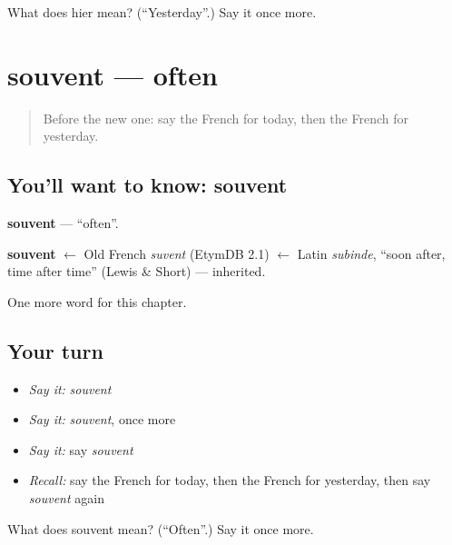 \begin{tcolorbox}[breakable,colback=teal!4,colframe=teal!35!black,title={Before you move on}]
What does hier mean? (\textquotedblleft{}Yesterday\textquotedblright{}.) Say it once more.
\end{tcolorbox}
\section[souvent]{souvent — often}

\label{lesson:FR-C98-souvent}



\begin{quote}
Before the new one: say the French for today, then the French for yesterday.
\end{quote}

\subsection*{You'll want to know: souvent}
\textbf{souvent} — \textquotedblleft{}often\textquotedblright{}.

\begin{cousinweb}
\textbf{souvent} $\leftarrow$ Old French \emph{suvent} (EtymDB 2.1) $\leftarrow$ Latin \emph{subinde}, \textquotedblleft{}soon after, time after time\textquotedblright{} (Lewis \& Short) — inherited.
\end{cousinweb}

\begin{grammarlens}[title={What you've built}]
One more word for this chapter.
\end{grammarlens}

\subsection*{Your turn}
\begin{itemize}
\raggedright
  \item \emph{Say it:} \emph{souvent}
  \item \emph{Say it:} \emph{souvent}, once more
  \item \emph{Say it:} say \emph{souvent}
  \item \emph{Recall:} say the French for today, then the French for yesterday, then say \emph{souvent} again
\end{itemize}

\begin{tcolorbox}[breakable,colback=teal!4,colframe=teal!35!black,title={Before you move on}]
What does souvent mean? (\textquotedblleft{}Often\textquotedblright{}.) Say it once more.
\end{tcolorbox}
